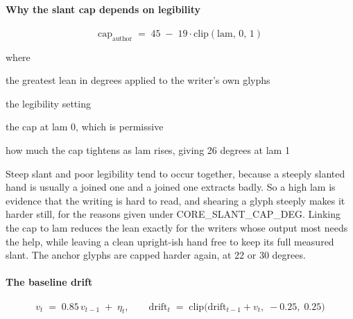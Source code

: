 \paragraph{Why the slant cap depends on legibility}

\begin{equation}
\mathrm{cap}_{\mathrm{author}} \;=\; 45 \;-\; 19 \cdot \mathrm{clip}(\mathrm{lam},\,0,\,1)
\end{equation}

\noindent where
\begin{description}[leftmargin=2.4em,style=nextline,font=\normalfont\ttfamily]\setlength\itemsep{1pt}
  \item[{$\mathrm{cap}_{\mathrm{author}}$}] \normalfont the greatest lean in degrees applied to the writer's own glyphs
  \item[{$\mathrm{lam}$}] \normalfont the legibility setting
  \item[{$45$}] \normalfont the cap at lam 0, which is permissive
  \item[{$19$}] \normalfont how much the cap tightens as lam rises, giving 26 degrees at lam 1
\end{description}
Steep slant and poor legibility tend to occur together, because a steeply slanted hand is usually a joined one and a joined one extracts badly. So a high lam is evidence that the writing is hard to read, and shearing a glyph steeply makes it harder still, for the reasons given under CORE\_SLANT\_CAP\_DEG. Linking the cap to lam reduces the lean exactly for the writers whose output most needs the help, while leaving a clean upright-ish hand free to keep its full measured slant. The anchor glyphs are capped harder again, at 22 or 30 degrees.


\paragraph{The baseline drift}

\begin{equation}
v_{t} \;=\; 0.85\,v_{t-1} \;+\; \eta_t, \qquad \mathrm{drift}_t \;=\; \mathrm{clip}\big(\mathrm{drift}_{t-1} + v_t,\; -0.25,\; 0.25\big)
\end{equation}

